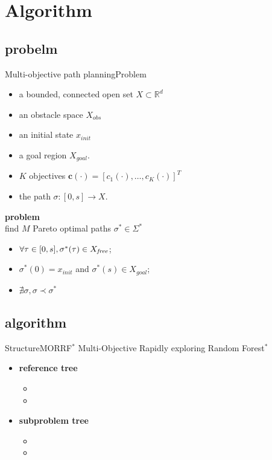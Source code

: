 \section{Algorithm}

\subsection{probelm}

\begin{frame}{Multi-objective path planning}{Problem}
	
\begin{itemize}
\item a bounded, connected open set $ X \subset \mathbb{R}^{d} $
\item an obstacle space $ X_{obs} $
\item an initial state $ x_{init} $
\item a goal region $ X_{goal} $. 
\item $K$ objectives  $ \bm{c}(\cdot) = [ c_{1} (\cdot), \ldots , c_{K}(\cdot) ]^{T}$ 
\item the path  $\sigma : [0,s] \rightarrow X$. 
\end{itemize}

\textbf{problem} \\
find $ M $ Pareto optimal paths $ \sigma^{*} \in \Sigma^{*}$ 
\begin{itemize}
\item $\forall \tau\in[0,s], \sigma^*(\tau) \in X_{\it free}$;
\item $ \sigma^{*} (0) = x_{init} $ and $ \sigma^{*} (s) \in X_{goal}  $;
\item $ \nexists \sigma, \sigma \prec \sigma^{*} $     
\end{itemize}                        
	
\end{frame}

\subsection{algorithm}

\begin{frame}{Structure}{MORRF$^{*}$}
Multi-Objective Rapidly exploring Random Forest$^{*}$
\begin{itemize}
	\item \textbf{reference tree}
	\begin{itemize}
	\item
	\item
	\end{itemize}	
	\item \textbf{subproblem tree}
	\begin{itemize}
	\item
	\item
	\end{itemize}
\end{itemize}
\end{frame}

